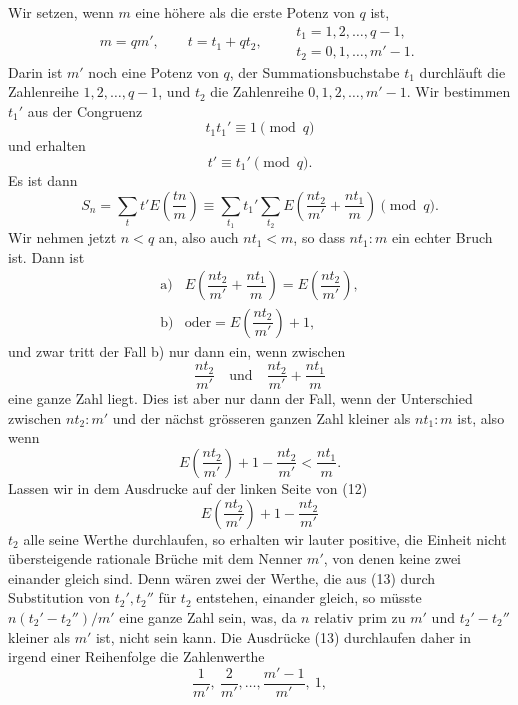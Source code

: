 \documentclass[11pt]{article}
\begin{document}
Wir setzen, wenn $m$ eine höhere als die erste Potenz von $q$ ist,
\[
m=qm',\qquad t=t_1+qt_2,\qquad
\begin{array}{l}
t_1=1,2,\ldots,q-1,\\
t_2=0,1,\ldots,m'-1.
\end{array}
\]
Darin ist $m'$ noch eine Potenz von $q$, der Summationsbuchstabe $t_1$ durchläuft die Zahlenreihe $1,2,\ldots,q-1$, und $t_2$ die Zahlenreihe $0,1,2,\ldots,m'-1$. Wir bestimmen $t_1'$ aus der Congruenz
\[
t_1t_1'\equiv1\pmod q
\]
und erhalten
\[
t'\equiv t_1'\pmod q.
\]
Es ist dann
\begin{equation}
S_n=\sum_t t'E\left(\frac{tn}{m}\right)
\equiv
\sum_{t_1}t_1'\sum_{t_2}E\left(\frac{nt_2}{m'}+\frac{nt_1}{m}\right)
\pmod q.
\tag{11}
\end{equation}
Wir nehmen jetzt $n<q$ an, also auch $nt_1<m$, so dass $nt_1:m$ ein echter Bruch ist. Dann ist
\[
\begin{array}{ll}
\text{a)}& E\left(\dfrac{nt_2}{m'}+\dfrac{nt_1}{m}\right)=E\left(\dfrac{nt_2}{m'}\right),\\[1.2em]
\text{b)}& \text{oder}=E\left(\dfrac{nt_2}{m'}\right)+1,
\end{array}
\]
und zwar tritt der Fall b) nur dann ein, wenn zwischen
\[
\frac{nt_2}{m'}\quad\text{und}\quad \frac{nt_2}{m'}+\frac{nt_1}{m}
\]
eine ganze Zahl liegt. Dies ist aber nur dann der Fall, wenn der Unterschied zwischen $nt_2:m'$ und der nächst grösseren ganzen Zahl kleiner als $nt_1:m$ ist, also wenn
\begin{equation}
E\left(\frac{nt_2}{m'}\right)+1-\frac{nt_2}{m'}<\frac{nt_1}{m}.
\tag{12}
\end{equation}
Lassen wir in dem Ausdrucke auf der linken Seite von (12)
\begin{equation}
E\left(\frac{nt_2}{m'}\right)+1-\frac{nt_2}{m'}
\tag{13}
\end{equation}
$t_2$ alle seine Werthe durchlaufen, so erhalten wir lauter positive, die Einheit nicht übersteigende rationale Brüche mit dem Nenner $m'$, von denen keine zwei einander gleich sind. Denn wären zwei der Werthe, die aus (13) durch Substitution von $t_2',t_2''$ für $t_2$ entstehen, einander gleich, so müsste $n(t_2'-t_2'')/m'$ eine ganze Zahl sein, was, da $n$ relativ prim zu $m'$ und $t_2'-t_2''$ kleiner als $m'$ ist, nicht sein kann. Die Ausdrücke (13) durchlaufen daher in irgend einer Reihenfolge die Zahlenwerthe
\begin{equation}
\frac1{m'},\ \frac2{m'},\ldots,\frac{m'-1}{m'},\ 1,
\tag{14}
\end{equation}
\end{document}
